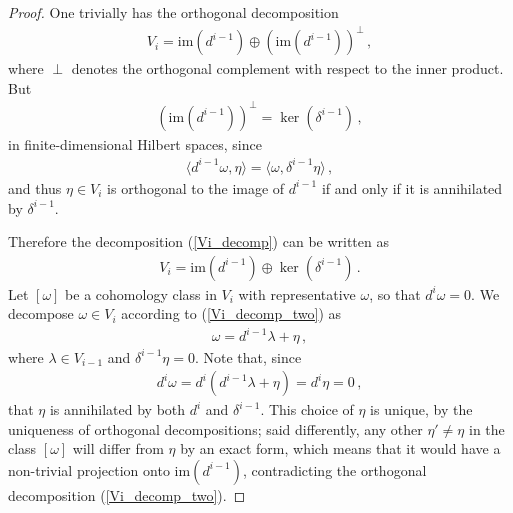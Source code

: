 \documentclass[10pt,a4paper]{amsart}
\newcommand{\im}{\mathrm{im}}
\begin{document}
\begin{proof}
    One trivially has the orthogonal decomposition
    \begin{align}\label{Vi_decomp}
        V_i = \mathrm{im} \left( d^{i-1} \right) \oplus \left( \mathrm{im} \left( d^{i-1} \right) \right)^\perp \, ,
    \end{align}
    where $\perp$ denotes the orthogonal complement with respect to the inner product. But 
    \begin{align}
        \left( \mathrm{im} \left( d^{i-1} \right) \right)^\perp = \ker \left( \delta^{i-1} \right) \, ,
    \end{align}
    in finite-dimensional Hilbert spaces, since
    \begin{align}
        \langle d^{i-1} \omega , \eta \rangle = \langle \omega, \delta^{i - 1} \eta \rangle \, ,
    \end{align}
    and thus $\eta \in V_i$ is orthogonal to the image of $d^{i-1}$ if and only if it is annihilated by $\delta^{i - 1}$.

    Therefore the decomposition (\ref{Vi_decomp}) can be written as
    \begin{align}\label{Vi_decomp_two}
        V_i = \im \left( d^{i-1} \right) \oplus \ker \left( \delta^{i - 1} \right) \, .
    \end{align}
    Let $[\omega]$ be a cohomology class in $V_i$ with representative $\omega$, so that $d^i \omega = 0$. We decompose $\omega \in V_i$ according to (\ref{Vi_decomp_two}) as
    \begin{align}
        \omega = d^{i-1} \lambda + \eta \, ,
    \end{align}
    where $\lambda \in V_{i-1}$ and $\delta^{i-1} \eta = 0$. Note that, since
    \begin{align}
        d^i \omega = d^i \left( d^{i-1} \lambda + \eta \right) = d^i \eta = 0 \, ,
    \end{align}
    that $\eta$ is annihilated by both $d^i$ and $\delta^{i-1}$. This choice of $\eta$ is unique, by the uniqueness of orthogonal decompositions; said differently, any other $\eta' \neq \eta$ in the class $[\omega]$ will differ from $\eta$ by an exact form, which means that it would have a non-trivial projection onto $\im ( d^{i-1} )$, contradicting the orthogonal decomposition (\ref{Vi_decomp_two}).


\end{proof}
\end{document}

